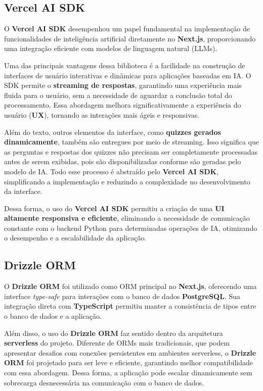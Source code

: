 \documentclass[tcc,capa]{texufpel}
\begin{document}
\subsection{Vercel AI SDK}

O \textbf{Vercel AI SDK} desempenhou um papel fundamental na implementação de funcionalidades de inteligência artificial diretamente no \textbf{Next.js}, proporcionando uma integração eficiente com modelos de linguagem natural (LLMs).  

Uma das principais vantagens dessa biblioteca é a facilidade na construção de interfaces de usuário interativas e dinâmicas para aplicações baseadas em IA. O SDK permite o \textbf{streaming de respostas}, garantindo uma experiência mais fluida para o usuário, sem a necessidade de aguardar a conclusão total do processamento. Essa abordagem melhora significativamente a experiência do usuário (\textbf{UX}), tornando as interações mais ágeis e responsivas.  

Além do texto, outros elementos da interface, como \textbf{quizzes gerados dinamicamente}, também são entregues por meio de streaming. Isso significa que as perguntas e respostas dos quizzes não precisam ser completamente processadas antes de serem exibidas, pois são disponibilizadas conforme são geradas pelo modelo de IA. Todo esse processo é abstraído pelo \textbf{Vercel AI SDK}, simplificando a implementação e reduzindo a complexidade no desenvolvimento da interface.  

Dessa forma, o uso do \textbf{Vercel AI SDK} permitiu a criação de uma \textbf{UI altamente responsiva e eficiente}, eliminando a necessidade de comunicação constante com o backend Python para determinadas operações de IA, otimizando o desempenho e a escalabilidade da aplicação.


\subsection{Drizzle ORM}

O \textbf{Drizzle ORM} foi utilizado como ORM principal no \textbf{Next.js}, oferecendo uma interface \textit{type-safe} para interações com o banco de dados \textbf{PostgreSQL}. Sua integração direta com \textbf{TypeScript} permitiu manter a consistência de tipos entre o banco de dados e a aplicação.

Além disso, o uso do \textbf{Drizzle ORM} faz sentido dentro da arquitetura \textbf{serverless} do projeto. Diferente de ORMs mais tradicionais, que podem apresentar desafios com conexões persistentes em ambientes serverless, o \textbf{Drizzle ORM} foi projetado para ser leve e eficiente, garantindo melhor compatibilidade com essa abordagem. Dessa forma, a aplicação pode escalar dinamicamente sem sobrecarga desnecessária na comunicação com o banco de dados.
\end{document}
